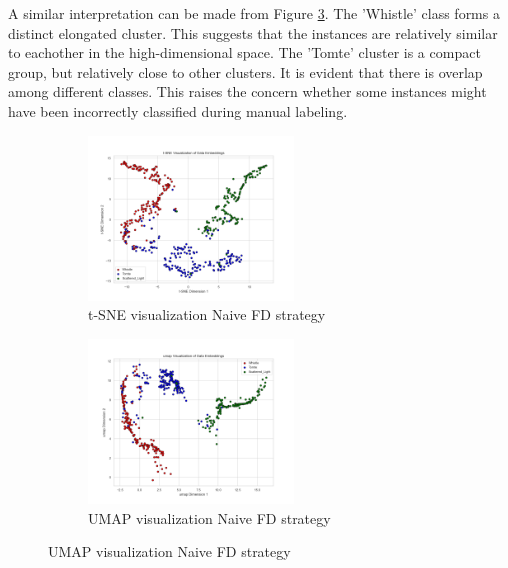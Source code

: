 A similar interpretation can be made from Figure \ref{fig:umap_FD_Naive}. The 'Whistle' class forms a distinct elongated cluster. This suggests that the instances are relatively similar to eachother in the high-dimensional space. The 'Tomte' cluster is a compact group, but relatively close to other clusters. It is evident that there is overlap among different classes. This raises the concern whether some instances might have been incorrectly classified during manual labeling. 

\begin{figure}[ht]
\centering
\begin{subfigure}
  \centering
    \includegraphics[width=0.6\textwidth]{Grad Assignment/Images/tSNE_FractalDimension_naive_test.png}
    \caption{t-SNE visualization Naive FD strategy}
    \label{fig:tSNE_FD_Naive}
\end{subfigure}
\begin{subfigure}
  \centering
    \includegraphics[width=0.6\textwidth]{Grad Assignment/Images/umap_FractalDimension_naive_test.png}
    \caption{UMAP visualization Naive FD strategy}
    \label{fig:umap_FD_Naive}
\end{subfigure}
\end{figure}